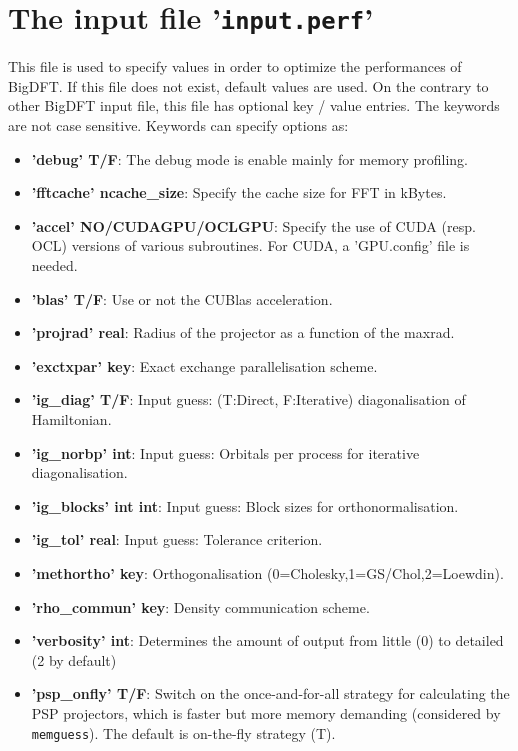 \documentclass[a4paper,11pt]{report}
\begin{document}
\section{The input file '\texttt{input.perf}'}
This file is used to specify values in order to optimize the performances of BigDFT. If this file
does not exist, default values are used. On the contrary to other BigDFT input file, this file has optional key / value entries. The keywords are not case sensitive. Keywords can specify options as:
\begin{itemize}
  \item  \textbf{'debug' T/F}: The debug mode is enable mainly for memory profiling.
  \item  \textbf{'fftcache' ncache\_size}: Specify the cache size for FFT in kBytes.
  \item  \textbf{'accel' NO/CUDAGPU/OCLGPU}: Specify the use of CUDA (resp. OCL) versions of various subroutines. For CUDA, a 'GPU.config' file is needed.
  \item  \textbf{'blas' T/F}:           Use or not the CUBlas acceleration.
  \item  \textbf{'projrad' real}:       Radius of the projector as a function of the maxrad.
  \item  \textbf{'exctxpar' key}:       Exact exchange parallelisation scheme.
  \item  \textbf{'ig\_diag' T/F}:       Input guess: (T:Direct, F:Iterative) diagonalisation of Hamiltonian.
  \item  \textbf{'ig\_norbp' int}:      Input guess: Orbitals per process for iterative diagonalisation.
  \item  \textbf{'ig\_blocks' int int}: Input guess: Block sizes for orthonormalisation.
  \item  \textbf{'ig\_tol' real}:       Input guess: Tolerance criterion.
  \item  \textbf{'methortho' key}:      Orthogonalisation (0=Cholesky,1=GS/Chol,2=Loewdin).
  \item  \textbf{'rho\_commun' key}:    Density communication scheme.
  \item  \textbf{'verbosity' int}:      Determines the amount of output from little (0) to detailed (2 by default)
  \item  \textbf{'psp\_onfly' T/F}:     Switch on the once-and-for-all strategy for calculating the PSP projectors, which
      is faster but more memory demanding (considered by \texttt{memguess}). The default is on-the-fly strategy (T).
\end{itemize}
\end{document}

